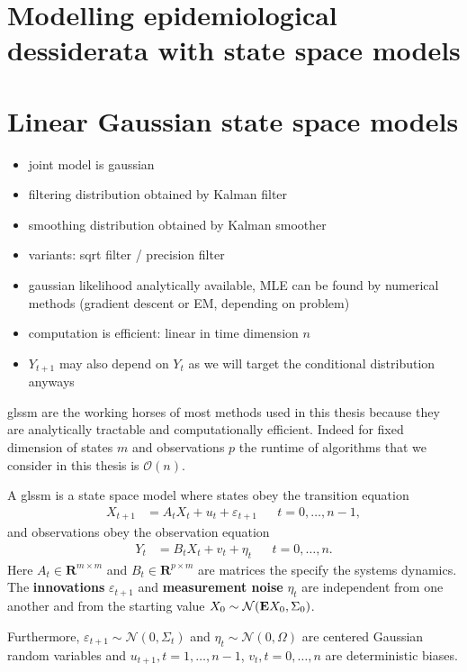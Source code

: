 \section{Modelling epidemiological dessiderata with state space models}
\label{sec:modelling_epidemiological_dessiderata_with_state_space_models}

\section{Linear Gaussian state space models}
\label{sec:linear_gaussian_state_space_models}

\begin{itemize}
    \item joint model is gaussian
    \item filtering distribution obtained by Kalman filter
    \item smoothing distribution obtained by Kalman smoother
    \item variants: sqrt filter / precision filter
    \item gaussian likelihood analytically available, MLE can be found by numerical methods (gradient descent or EM, depending on problem)
    \item computation is efficient: linear in time dimension $n$
    \item $Y_{t + 1}$ may also depend on $Y_{t}$ as we will target the conditional distribution anyways
\end{itemize}

\gls{glssm} are the working horses of most methods used in this thesis because they are analytically tractable and computationally efficient. Indeed for fixed dimension of states $m$ and observations $p$ the runtime of algorithms that we consider in this thesis is $\mathcal O(n)$.

\begin{definition}
    \label{def:glssm}
    A \gls{glssm} is a state space model where states obey the transition equation
    \begin{align}
        \label{eq:glssm_states}
        X_{t + 1} & = A_{t}X_{t} + u_{t} + \varepsilon_{t + 1} &  & t = 0, \dots, n - 1,
    \end{align}
    and observations obey the observation equation
    \begin{align}
        \label{eq:glssm_observations}
        Y_{t} & = B_{t}X_{t} + v_{t} + \eta_{t} &  & t = 0, \dots, n.
    \end{align}
    Here $A_{t} \in \mathbf{R}^{m \times m}$ and $B_{t} \in \mathbf{R}^{p \times m}$ are matrices the specify the systems dynamics. The \textbf{innovations} $\varepsilon_{t + 1}$ and \textbf{measurement noise} $\eta_{t}$ are independent from one another and from the starting value $X_{0} \sim \mathcal N (\mathbf E X_{0}, \Sigma_{0})$.

    Furthermore, $\varepsilon_{t+1} \sim \mathcal N(0, \Sigma_{t})$ and $\eta_{t}\sim \mathcal N(0, \Omega)$ are centered Gaussian random variables and $u_{t + 1}, t = 1, \dots, n-1$, $v_{t}, t = 0, \dots, n$ are deterministic biases.
\end{definition}

